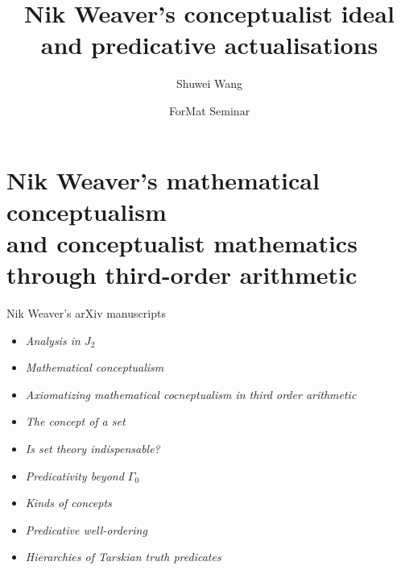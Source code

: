 \documentclass{beamer}
\title[Weaver's conceptualism and predicativism]{Nik Weaver's conceptualist ideal\\and predicative actualisations}
\author{Shuwei Wang}
\date[ForMat Oct 26]{\small ForMat Seminar\\\DTMdate{2026-10-26}}
\newcommand{\highlight}[1]{{\usebeamercolor[fg]{frametitle}\emph{#1}}}
\begin{document}
\begin{frame}
  \titlepage
\end{frame}

\begin{frame}
  \tableofcontents
\end{frame}

\section{Nik Weaver's mathematical conceptualism\\and conceptualist mathematics through third-order arithmetic}

\begin{frame}{Nik Weaver's arXiv manuscripts}
  \begin{itemize}
    \item \emph{Analysis in $J_2$} 
    \item \emph{Mathematical conceptualism} 
    \item \highlight{Axiomatizing mathematical cocneptualism in third order arithmetic} 
    \item \emph{The concept of a set} 
    \item \emph{Is set theory indispensable?} 
    \item \emph{Predicativity beyond $\Gamma_0$} 
    \item \emph{Kinds of concepts} 
    \item \emph{Predicative well-ordering} 
    \item \emph{Hierarchies of Tarskian truth predicates} 
  \end{itemize}
\end{frame}
\end{document}
